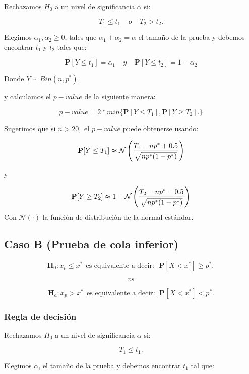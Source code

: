 \documentclass[
  a4paper,
  oneside,
  openany]{book}
\begin{document}
Rechazamos \(H_0\) a un nivel de significancia \(\alpha\) si:

\[T_{1}\leq t_{1} \ \ \ \ \  o   \ \ \ \ \ T_{2}>t_{2}.\]

Elegimos \(\alpha_{1},\alpha_{2}\geq 0\), tales que \(\alpha_{1}+\alpha_{2}=\alpha\) el tamaño de la prueba y debemos encontrar \(t_{1}\) y \(t_{2}\) tales que:

\[\mathbf{P}[Y \leq t_{1}]=\alpha_{1} \ \ \ \ \  y  \ \ \ \ \ \mathbf{P}[Y \leq t_{2}]=1-\alpha_{2}\]

Donde \(Y \sim Bin (n,p^*)\).

y calculamos el \(p-value\) de la siguiente manera:

\[p-value=2*min \{ \mathbf{P}[Y\leq T_{1}],\mathbf{P}[Y \geq T_{2}]. \}\]

Sugerimos que si \(n > 20,\) el \(p-value\) puede obtenerse usando:

\[\mathbf{P}[Y\leq T_{1}] \thickapprox \mathcal{N}\left(\frac{T_{1}-np^*+0.5}{\sqrt{np^*(1-p^*)}}\right)\]

y

\[\mathbf{P}[Y\geq T_{2}] \thickapprox 1-\mathcal{N} \left(\frac{T_{2}-np^*-0.5}{\sqrt{np^*(1-p^*)}}\right)\]
Con \(\mathcal{N}(\cdot)\) la función de distribución de la normal estándar.

\hypertarget{caso-b-prueba-de-cola-inferior-1}{%
\subsection*{Caso B (Prueba de cola inferior)}\label{caso-b-prueba-de-cola-inferior-1}}


\[\textbf{H}_0: x_{p} \leq x^* \ \ \mbox{es equivalente a decir:} \ \ \ \mathbf{P}[X < x^*]\geq p^*,\]

\[vs\]

\[
\textbf{H}_a: x_{p} > x^* \ \  \mbox{es equivalente a decir}: \ \ \mathbf{P}[X < x^*]< p^*.
\]

\hypertarget{regla-de-decisiuxf3n-4}{%
\subsubsection*{Regla de decisión}\label{regla-de-decisiuxf3n-4}}


Rechazamos \(H_0\) a un nivel de significancia \(\alpha\) si:

\[T_{1} \leq t_{1}.\]

Elegimos \(\alpha\), el tamaño de la prueba y debemos encontrar \(t_{1}\) tal que:
\end{document}
